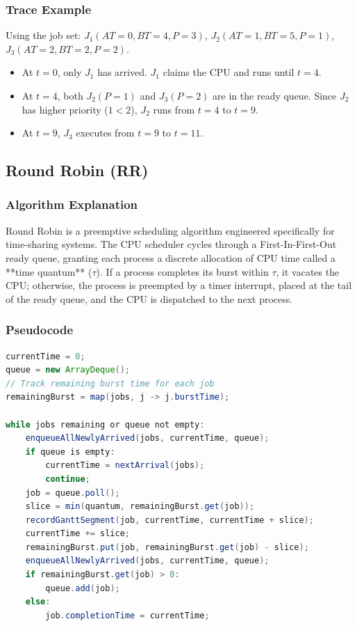 \documentclass[12pt,a4paper]{article}
\begin{document}
\subsubsection{Trace Example}
Using the job set: $J_1(AT=0, BT=4, P=3)$, $J_2(AT=1, BT=5, P=1)$, $J_3(AT=2, BT=2, P=2)$.
\begin{itemize}
    \item At $t=0$, only $J_1$ has arrived. $J_1$ claims the CPU and runs until $t=4$.
    \item At $t=4$, both $J_2(P=1)$ and $J_3(P=2)$ are in the ready queue. Since $J_2$ has higher priority ($1 < 2$), $J_2$ runs from $t=4$ to $t=9$.
    \item At $t=9$, $J_3$ executes from $t=9$ to $t=11$.
\end{itemize}

\subsection{Round Robin (RR)}
\subsubsection{Algorithm Explanation}
Round Robin is a preemptive scheduling algorithm engineered specifically for time-sharing systems. The CPU scheduler cycles through a First-In-First-Out ready queue, granting each process a discrete allocation of CPU time called a **time quantum** ($\tau$). If a process completes its burst within $\tau$, it vacates the CPU; otherwise, the process is preempted by a timer interrupt, placed at the tail of the ready queue, and the CPU is dispatched to the next process.

\subsubsection{Pseudocode}
\begin{lstlisting}[language=Java, caption={Round Robin Scheduling Logic ($\tau = \text{quantum}$)}]
currentTime = 0;
queue = new ArrayDeque();
// Track remaining burst time for each job
remainingBurst = map(jobs, j -> j.burstTime);

while jobs remaining or queue not empty:
    enqueueAllNewlyArrived(jobs, currentTime, queue);
    if queue is empty:
        currentTime = nextArrival(jobs);
        continue;
    job = queue.poll();
    slice = min(quantum, remainingBurst.get(job));
    recordGanttSegment(job, currentTime, currentTime + slice);
    currentTime += slice;
    remainingBurst.put(job, remainingBurst.get(job) - slice);
    enqueueAllNewlyArrived(jobs, currentTime, queue);
    if remainingBurst.get(job) > 0:
        queue.add(job);
    else:
        job.completionTime = currentTime;
\end{lstlisting}
\end{document}
